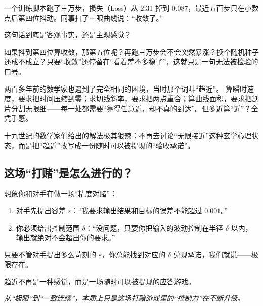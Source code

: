 一个训练脚本跑了三万步，损失（Loss）从 2.31 掉到 0.087，最近五百步只在小数点后第四位抖动。同事扫了一眼曲线说：“收敛了。”

这句话到底是客观事实，还是主观感觉？

如果抖到第四位算收敛，那第五位呢？再跑三万步会不会突然暴涨？换个随机种子还成不成立？只要“收敛”还停留在“看着差不多稳了”，这就只是一句无法被检验的口号。

两百多年前的数学家也遇到了完全相同的困境，当时那个词叫“趋近”。
算瞬时速度，要求把时间压缩到零；求切线斜率，要求把两点重合；算曲线面积，要求把割片分割无限细——每一处都需要“靠得任意近，却不真的到达”。但多近算“近”？全凭手感。

十九世纪的数学家们给出的解法极其狠辣：不再去讨论“无限接近”这种玄学心理状态，而是把“趋近”改写成一份随时可以被提现的“验收承诺”。

\subsection*{这场“打赌”是怎么进行的？}

想象你和对手在做一场“精度对赌”：
\begin{enumerate}
    \item 对手先提出容差 $\varepsilon$：“我要求输出结果和目标的误差不能超过 $0.001$。”
    \item 你必须给出控制范围 $\delta$：“没问题，只要你把输入的波动控制在半径 $\delta$ 以内，输出就绝对不会超出你的要求。”
\end{enumerate}

只要不管对手提出多么苛刻的 $\varepsilon$，你总能找到对应的 $\delta$ 兑现承诺，我们就说——极限存在。

趋近不再是一种感觉，而是一场随时可以被提现的应答游戏。

\begin{center}

\emph{从“极限”到“一致连续”，本质上只是这场打赌游戏里的“控制力”在不断升级。}
\end{center}

